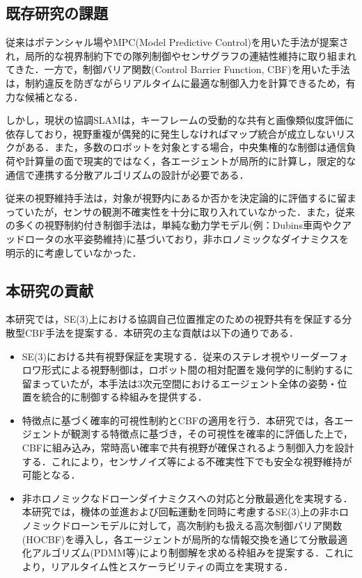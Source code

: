 \subsection{既存研究の課題}

従来はポテンシャル場やMPC(Model Predictive Control)を用いた手法が提案され，局所的な視界制約下での隊列制御やセンサグラフの連結性維持に取り組まれてきた\cite{Sabattini2013}．一方で，制御バリア関数(Control Barrier Function, CBF)を用いた手法は，制約違反を防ぎながらリアルタイムに最適な制御入力を計算できるため，有力な候補となる\cite{Capelli2020}．

しかし，現状の協調SLAMは，キーフレームの受動的な共有と画像類似度評価に依存しており，視野重複が偶発的に発生しなければマップ統合が成立しないリスクがある．また，多数のロボットを対象とする場合，中央集権的な制御は通信負荷や計算量の面で現実的ではなく，各エージェントが局所的に計算し，限定的な通信で連携する分散アルゴリズムの設計が必要である．

従来の視野維持手法は，対象が視野内にあるか否かを決定論的に評価するに留まっていたが，センサの観測不確実性を十分に取り入れていなかった\cite{Panagou2012}．また，従来の多くの視野制約付き制御手法は，単純な動力学モデル(例：Dubins車両やクアッドロータの水平姿勢維持)に基づいており，非ホロノミックなダイナミクスを明示的に考慮していなかった\cite{Dias2016}．

\subsection{本研究の貢献}

本研究では，SE(3)上における協調自己位置推定のための視野共有を保証する分散型CBF手法を提案する．本研究の主な貢献は以下の通りである．

\begin{itemize}
\item SE(3)における共有視野保証を実現する．従来のステレオ視やリーダーフォロワ形式による視野制御は，ロボット間の相対配置を幾何学的に制約するに留まっていたが，本手法は3次元空間におけるエージェント全体の姿勢・位置を統合的に制御する枠組みを提供する．

\item 特徴点に基づく確率的可視性制約とCBFの適用を行う．本研究では，各エージェントが観測する特徴点に基づき，その可視性を確率的に評価した上で，CBFに組み込み，常時高い確率で共有視野が確保されるよう制御入力を設計する．これにより，センサノイズ等による不確実性下でも安全な視野維持が可能となる．

\item 非ホロノミックなドローンダイナミクスへの対応と分散最適化を実現する．本研究では，機体の並進および回転運動を同時に考慮するSE(3)上の非ホロノミックドローンモデルに対して，高次制約も扱える高次制御バリア関数(HOCBF)を導入し，各エージェントが局所的な情報交換を通じて分散最適化アルゴリズム(PDMM等)により制御解を求める枠組みを提案する\cite{Lv2024}．これにより，リアルタイム性とスケーラビリティの両立を実現する．
\end{itemize}

